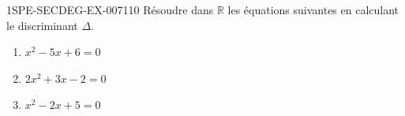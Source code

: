 \begin{exercice}{1SPE-SECDEG-EX-007}{1}{10}
Résoudre dans $\mathbb{R}$ les équations suivantes en calculant le discriminant $\Delta$.

\begin{enumerate}
  \item $x^2 - 5x + 6 = 0$
  \item $2x^2 + 3x - 2 = 0$
  \item $x^2 - 2x + 5 = 0$
\end{enumerate}
\end{exercice}
